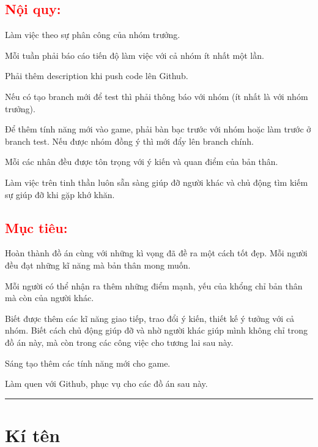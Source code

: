 \documentclass{article}
\begin{document}
\textcolor{red}{\section{\Large{Nội quy:}}}
\begin{enumerate}
    \large{
    \item Làm việc theo sự phân công của nhóm trưởng.
    \item Mỗi tuần phải báo cáo tiến độ làm việc với cả nhóm ít nhất một lần.
    \item Phải thêm description khi push code lên Github.
    \item Nếu có tạo branch mới để test thì phải thông báo với nhóm (ít nhất là với nhóm trưởng). 
    \item Để thêm tính năng mới vào game, phải bàn bạc trước với nhóm hoặc làm trước ở branch test. Nếu được nhóm đồng ý thì mới đẩy lên branch chính.
    \item Mỗi các nhân đều được tôn trọng với ý kiến và quan điểm của bản thân.
    \item Làm việc trên tinh thần luôn sẵn sàng giúp đỡ người khác và chủ động tìm kiếm sự giúp đỡ khi gặp khớ khăn.
    }
\end{enumerate}

\textcolor{red}{\section{\Large{Mục tiêu:}}}
\begin{enumerate}
    \large{
    \item Hoàn thành đồ án cùng với những kì vọng đã đề ra một cách tốt đẹp. Mỗi người đều đạt những kĩ năng mà bản thân mong muốn.
    \item Mỗi người có thể nhận ra thêm những điểm mạnh, yếu của khổng chỉ bản thân mà còn của người khác.
    \item Biết được thêm các kĩ năng giao tiếp, trao đổi ý kiến, thiết kế ý tưởng với cả nhóm. Biết cách chủ động giúp đỡ và nhờ người khác giúp mình không chỉ trong đồ án này, mà còn trong các công việc cho tương lai sau này.  
    \item Sáng tạo thêm các tính năng mới cho game.
    \item Làm quen với Github, phục vụ cho các đồ án sau này.
    }
    
\end{enumerate}


\noindent
{\color{cyan} \rule{\linewidth}{0.5mm} }

\section*{\Large{Kí tên}}
\end{document}
